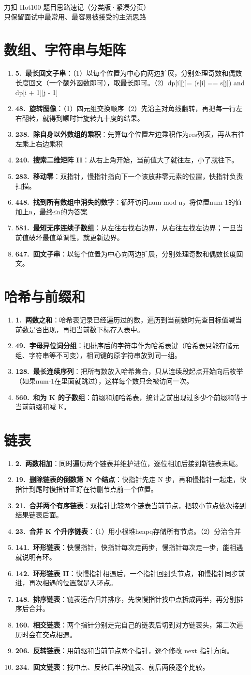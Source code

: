 \documentclass[12pt,a4paper]{ctexart}
\newcommand{\hotitem}[3]{\item \textbf{#1.~#2}：#3}
\newcommand{\hotsection}[2]{%
  \Needspace{#1\baselineskip}%
  \section*{#2}
  \begin{enumerate}[leftmargin=0pt,label={},itemsep=0.48em]
}
\newcommand{\hotend}{\end{enumerate}}
\begin{document}
\begin{center}
    {\LARGE 力扣 Hot100 题目思路速记（分类版·紧凑分页）}\\[0.6em]
    {\large 只保留面试中最常用、最容易被接受的主流思路}
\end{center}

\vspace{0.6em}


\hotsection{22}{数组、字符串与矩阵}
    \hotitem{5}{最长回文子串}{（1）以每个位置为中心向两边扩展，分别处理奇数和偶数长度回文（一个额外函数即可），取最长即可。（2）dp[i][j]= (s[i] == s[j]) and dp[i + 1][j - 1]}
    \hotitem{48}{旋转图像}{（1）四元组交换顺序（2）先沿主对角线翻转，再把每一行左右翻转，就得到顺时针旋转九十度的结果。}
    \hotitem{238}{除自身以外数组的乘积}{先算每个位置左边乘积作为res列表，再从右往左乘上右边乘积}
    \hotitem{240}{搜索二维矩阵 II}{从右上角开始，当前值大了就往左，小了就往下。}
    \hotitem{283}{移动零}{双指针，慢指针指向下一个该放非零元素的位置，快指针负责扫描。}
    \hotitem{448}{找到所有数组中消失的数字}{循环访问num mod n，将位置num-1的值加上n，最终≤n的为答案}
    \hotitem{581}{最短无序连续子数组}{从左往右找右边界，从右往左找左边界；一旦当前值破坏最值单调性，就更新边界。}
    \hotitem{647}{回文子串}{以每个位置为中心向两边扩展，分别处理奇数和偶数长度回文。}
\hotend

\hotsection{15}{哈希与前缀和}
    \hotitem{1}{两数之和}{哈希表记录已经遍历过的数，遍历到当前数时先查目标值减当前数是否出现，再把当前数下标存入表中。}
    \hotitem{49}{字母异位词分组}{把排序后的字符串作为哈希表键（哈希表只能存储元组、字符串等不可变），相同键的原字符串放到同一组。}
    \hotitem{128}{最长连续序列}{把所有数放入哈希集合，只从连续段起点开始向后枚举（如果num-1在里面就跳过），这样每个数只会被访问一次。}
    \hotitem{560}{和为 K 的子数组}{前缀和加哈希表，统计之前出现过多少个前缀和等于当前前缀和减 K。}
\hotend

\hotsection{28}{链表}
    \hotitem{2}{两数相加}{同时遍历两个链表并维护进位，逐位相加后接到新链表末尾。}
    \hotitem{19}{删除链表的倒数第 N 个结点}{快指针先走 N 步，再和慢指针一起走，快指针到尾时慢指针正好在待删节点前一个位置。}
    \hotitem{21}{合并两个有序链表}{双指针比较两个链表当前节点，把较小节点依次接到结果链表后面。}
    \hotitem{23}{合并 K 个升序链表}{（1）用小根堆heapq存储所有节点。（2）分治合并}
    \hotitem{141}{环形链表}{快慢指针，快指针每次走两步，慢指针每次走一步，能相遇就说明有环。}
    \hotitem{142}{环形链表 II}{快慢指针相遇后，一个指针回到头节点，和慢指针同步前进，再次相遇的位置就是入环点。}
    \hotitem{148}{排序链表}{链表适合归并排序，先快慢指针找中点拆成两半，再分别排序后合并。}
    \hotitem{160}{相交链表}{两个指针分别走完自己的链表后切到对方链表头，第二次遍历时会在交点相遇。}
    \hotitem{206}{反转链表}{用前驱和当前节点两个指针，逐个修改 next 指针方向。}
    \hotitem{234}{回文链表}{找中点、反转后半段链表、前后两段逐个比较。}
\hotend
\end{document}
